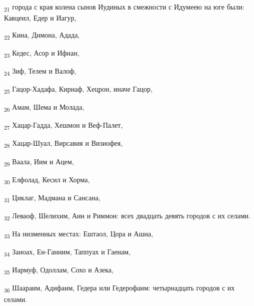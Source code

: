 \begin{tcolorbox}
\textsubscript{21} города с края колена сынов Иудиных в смежности с Идумеею на юге были: Кавцеил, Едер и Иагур,
\end{tcolorbox}
\begin{tcolorbox}
\textsubscript{22} Кина, Димона, Адада,
\end{tcolorbox}
\begin{tcolorbox}
\textsubscript{23} Кедес, Асор и Ифнан,
\end{tcolorbox}
\begin{tcolorbox}
\textsubscript{24} Зиф, Телем и Валоф,
\end{tcolorbox}
\begin{tcolorbox}
\textsubscript{25} Гацор-Хадафа, Кириаф, Хецрон, иначе Гацор,
\end{tcolorbox}
\begin{tcolorbox}
\textsubscript{26} Амам, Шема и Молада,
\end{tcolorbox}
\begin{tcolorbox}
\textsubscript{27} Хацар-Гадда, Хешмон и Веф-Палет,
\end{tcolorbox}
\begin{tcolorbox}
\textsubscript{28} Хацар-Шуал, Вирсавия и Визиофея,
\end{tcolorbox}
\begin{tcolorbox}
\textsubscript{29} Ваала, Иим и Ацем,
\end{tcolorbox}
\begin{tcolorbox}
\textsubscript{30} Елфолад, Кесил и Хорма,
\end{tcolorbox}
\begin{tcolorbox}
\textsubscript{31} Циклаг, Мадмана и Сансана,
\end{tcolorbox}
\begin{tcolorbox}
\textsubscript{32} Леваоф, Шелихим, Аин и Риммон: всех двадцать девять городов с их селами.
\end{tcolorbox}
\begin{tcolorbox}
\textsubscript{33} На низменных местах: Ештаол, Цора и Ашна,
\end{tcolorbox}
\begin{tcolorbox}
\textsubscript{34} Заноах, Ен-Ганним, Таппуах и Гаенам,
\end{tcolorbox}
\begin{tcolorbox}
\textsubscript{35} Иармуф, Одоллам, Сохо и Азека,
\end{tcolorbox}
\begin{tcolorbox}
\textsubscript{36} Шаараим, Адифаим, Гедера или Гедерофаим: четырнадцать городов с их селами.
\end{tcolorbox}
